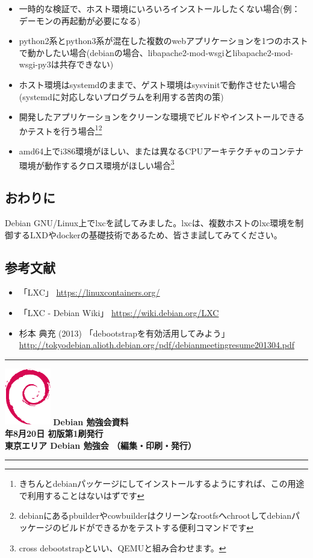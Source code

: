 \documentclass[mingoth,a4paper]{jsarticle}
\newcommand{\debmtgyear}{2016}
\newcommand{\debmtgmonth}{8}
\newcommand{\debmtgdate}{20}
\begin{document}
\begin{itemize}
\item 一時的な検証で、ホスト環境にいろいろインストールしたくない場合(例：デーモンの再起動が必要になる)
\item python2系とpython3系が混在した複数のwebアプリケーションを1つのホストで動かしたい場合(debianの場合、libapache2-mod-wsgiとlibapache2-mod-wsgi-py3は共存できない)
\item ホスト環境はsystemdのままで、ゲスト環境はsysvinitで動作させたい場合(systemdに対応しないプログラムを利用する苦肉の策)
\item 開発したアプリケーションをクリーンな環境でビルドやインストールできるかテストを行う場合\footnote{きちんとdebianパッケージにしてインストールするようにすれば、この用途で利用することはないはずです}\footnote{debianにあるpbuilderやcowbuilderはクリーンなrootfsへchrootしてdebianパッケージのビルドができるかをテストする便利コマンドです}
\item amd64上でi386環境がほしい、または異なるCPUアーキテクチャのコンテナ環境が動作するクロス環境がほしい場合\footnote{cross debootstrapといい、QEMUと組み合わせます。}
\end{itemize}


\subsection{おわりに}

Debian GNU/Linux上でlxcを試してみました。lxcは、複数ホストのlxc環境を制御するLXDやdockerの基礎技術であるため、皆さま試してみてください。


\subsection{参考文献}

\begin{itemize}
  \item 「LXC」 \url{https://linuxcontainers.org/}
  \item 「LXC - Debian Wiki」 \url{https://wiki.debian.org/LXC}
  \item 杉本 典充 (2013) 「debootstrapを有効活用してみよう」 \url{http://tokyodebian.alioth.debian.org/pdf/debianmeetingresume201304.pdf}
\end{itemize}


%
\mbox{}\newpage


\vspace*{15cm}
\hrule
\vspace{2mm}
\includegraphics[width=2cm]{image200502/openlogo-nd.eps}
\noindent \Large \bf Debian 勉強会資料\\
\noindent \normalfont \debmtgyear{}年\debmtgmonth{}月\debmtgdate{}日 \hspace{5mm}  初版第1刷発行\\
\noindent \normalfont 東京エリア Debian 勉強会 （編集・印刷・発行）\\
\hrule
\end{document}
